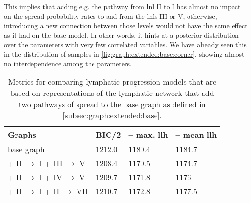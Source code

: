 \documentclass[\relativeRoot/main.tex]{subfiles}
\begin{document}
%
This implies that adding e.g. the pathway from \gls{lnl} II to I has almost no impact on the spread probability rates to and from the \glspl{lnl} III or V, otherwise, introducing a new connection between those levels would not have the same effect as it had on the base model. In other words, it hints at a posterior distribution over the parameters with very few correlated variables. We have already seen this in the distribution of samples in \cref{fig:graph:extended:base:corner}, showing almost no interdependence among the parameters.

\begin{table}
    \centering
    \begin{tabular}{|l|l|l|l|}
        \hline
        \textbf{Graphs} & \textbf{BIC/2} & \textbf{-- max. llh} & \textbf{-- mean llh} \\
        \hline
        base graph & 1212.0 & 1180.4 & 1184.7 \\
        + II $\rightarrow$ I + III $\rightarrow$ V & 1208.4 & 1170.5 & 1174.7 \\
        + II $\rightarrow$ I + IV $\rightarrow$ V & 1209.7 & 1171.8 & 1176 \\
        + II $\rightarrow$ I + II $\rightarrow$ VII & 1210.7 & 1172.8 & 1177.5 \\
        \hline
    \end{tabular}
    \caption[
        Comparison of graphs that add two new arcs to the base graph
    ]{
        Metrics for comparing lymphatic progression models that are based on representations of the lymphatic network that add two pathways of spread to the base graph as defined in \cref{subsec:graph:extended:base}.
    }
    \label{table:graph:extended:multi-arc}
\end{table}
\end{document}
